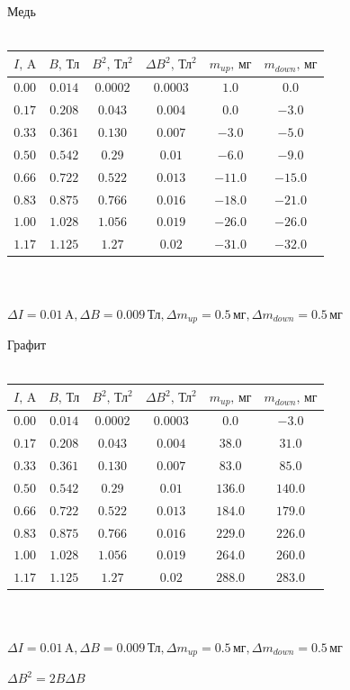\documentclass[a4paper,12pt]{article}
\begin{document}
\begin{center}
Медь\\~\\
\begin{tabular}{|c|c|c|c|c|c|}\hline
$I\text{, A}$&$B\text{, Тл}$&$B^2\text{, Тл}^2$&$\Delta B^2\text{, Тл}^2$&$m_{up}\text{, мг}$&$m_{down}\text{, мг}$\\\hline
$0.00$&$0.014$&$0.0002$&$0.0003$&$1.0$&$0.0$\\\hline
$0.17$&$0.208$&$0.043$&$0.004$&$0.0$&$-3.0$\\\hline
$0.33$&$0.361$&$0.130$&$0.007$&$-3.0$&$-5.0$\\\hline
$0.50$&$0.542$&$0.29$&$0.01$&$-6.0$&$-9.0$\\\hline
$0.66$&$0.722$&$0.522$&$0.013$&$-11.0$&$-15.0$\\\hline
$0.83$&$0.875$&$0.766$&$0.016$&$-18.0$&$-21.0$\\\hline
$1.00$&$1.028$&$1.056$&$0.019$&$-26.0$&$-26.0$\\\hline
$1.17$&$1.125$&$1.27$&$0.02$&$-31.0$&$-32.0$\\\hline
\end{tabular}\\~\\
$\Delta I=0.01\,\text{A}, \Delta B=0.009\,\text{Тл}, \Delta m_{up}=0.5\,\text{мг}, \Delta m_{down}=0.5\,\text{мг}$
\end{center}

\begin{center}
Графит\\~\\
\begin{tabular}{|c|c|c|c|c|c|}\hline
$I\text{, A}$&$B\text{, Тл}$&$B^2\text{, Тл}^2$&$\Delta B^2\text{, Тл}^2$&$m_{up}\text{, мг}$&$m_{down}\text{, мг}$\\\hline
$0.00$&$0.014$&$0.0002$&$0.0003$&$0.0$&$-3.0$\\\hline
$0.17$&$0.208$&$0.043$&$0.004$&$38.0$&$31.0$\\\hline
$0.33$&$0.361$&$0.130$&$0.007$&$83.0$&$85.0$\\\hline
$0.50$&$0.542$&$0.29$&$0.01$&$136.0$&$140.0$\\\hline
$0.66$&$0.722$&$0.522$&$0.013$&$184.0$&$179.0$\\\hline
$0.83$&$0.875$&$0.766$&$0.016$&$229.0$&$226.0$\\\hline
$1.00$&$1.028$&$1.056$&$0.019$&$264.0$&$260.0$\\\hline
$1.17$&$1.125$&$1.27$&$0.02$&$288.0$&$283.0$\\\hline
\end{tabular}\\~\\
$\Delta I=0.01\,\text{A}, \Delta B=0.009\,\text{Тл}, \Delta m_{up}=0.5\,\text{мг}, \Delta m_{down}=0.5\,\text{мг}$
\end{center}
$\Delta B^2=2B\Delta B$
\end{document}
